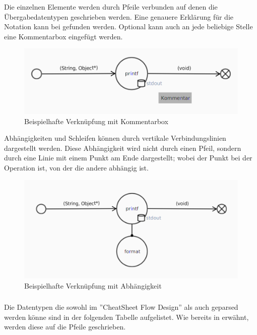 Die einzelnen Elemente werden durch Pfeile verbunden auf denen die Übergabedatentypen geschrieben werden. Eine genauere
Erklärung für die Notation kann bei  gefunden werden. Optional kann auch an jede beliebige Stelle
eine Kommentarbox eingefügt werden.
\begin{figure}[H]
	\centering
	\includegraphics[width=\maxwidth{.9\textwidth}]{Element_connected_comment.png}
	\caption{Beispielhafte Verknüpfung mit Kommentarbox}
	\label{flowElementConnectedComment}
\end{figure}

\pagebreak
Abhängigkeiten und Schleifen können durch vertikale Verbindungslinien dargestellt werden. Diese Abhängigkeit wird nicht durch einen
Pfeil, sondern durch eine Linie mit einem Punkt am Ende dargestellt; wobei der Punkt bei der Operation ist, von der die andere
abhängig ist.
\begin{figure}[H]
	\centering
	\includegraphics[width=\maxwidth{.9\textwidth}]{Element_connected_dep.png}
	\caption{Beispielhafte Verknüpfung mit Abhängigkeit}
	\label{flowElementConnectedDep}
\end{figure}

\subsubsection{\textFlowNotation}
\label{\textFlowNotation}
Die Datentypen die sowohl im ''CheatSheet Flow Design'' \cite{flowDesign} als auch geparsed werden könne sind in der folgenden
Tabelle aufgelistet. Wie bereits in  erwähnt, werden diese auf die Pfeile geschrieben.


